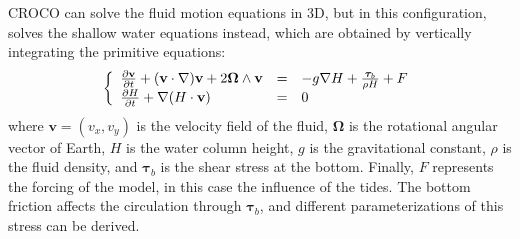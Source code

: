 \documentclass[../../Main_ManuscritThese.tex]{subfiles}
\newcommand{\CROCO}{CROCO}
\begin{document}
\CROCO{} can solve the fluid motion equations in 3D, but in this
configuration, solves the shallow water equations instead, which are
obtained by vertically integrating the primitive equations:
\begin{align}
  \left\{
  \begin{array}{lll}
    \frac{\partial \mathbf{v}}{\partial t} + (\mathbf{v} \cdot \nabla )\mathbf{v} + 2 \bm{\Omega} \wedge \mathbf{v} & = & -g\nabla H + \frac{\bm{\tau}_b}{\rho H} + F \\
    \frac{\partial H}{\partial t} + \nabla (H \cdot \mathbf{v})                                                     & = & 0
  \end{array}
                                                   \right.
\end{align}
where $\mathbf{v} = (v_x,v_y)$ is the velocity field of the fluid,
$\bm{\Omega}$ is the rotational angular vector of Earth, $H$ is the
water column height, $g$ is the gravitational constant, $\rho$ is the
fluid density, and $\bm{\tau}_b$ is the shear stress at the
bottom. Finally, $F$ represents the forcing of the model, in this case
the influence of the tides.  The bottom friction affects the
circulation through $\bm{\tau}_b$, and different parameterizations of
this stress can be derived.
\end{document}
